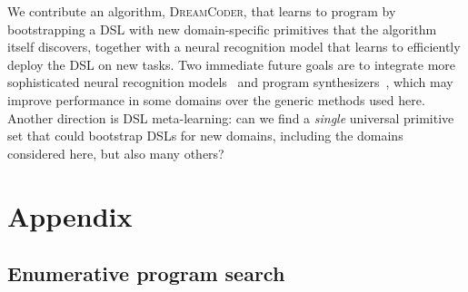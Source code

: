\documentclass{article}
\newcommand{\systemEnding}{\textsc{DreamCoder}}
\begin{document}
We contribute an algorithm, \systemEnding, that learns to program by
bootstrapping a DSL with new domain-specific primitives that the algorithm
itself discovers, together with a neural recognition model that learns to
efficiently deploy the DSL on new tasks. %
Two immediate future goals are to integrate more sophisticated neural recognition
models~\cite{devlin2017robustfill} and program
synthesizers~\cite{solar2008program}, which may improve performance in some
domains over the generic methods used here.
Another direction is DSL meta-learning: can we find a
\emph{single} universal primitive set that could bootstrap DSLs for
new domains, including the domains considered here,  but also many others?




\appendix

\section{Appendix}

\subsection{Enumerative program search}\label{enumerationAppendix}
\end{document}
